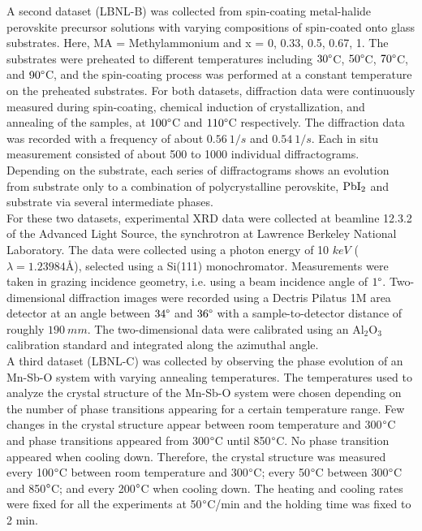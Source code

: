 A second dataset (LBNL-B) was collected from spin-coating metal-halide perovskite precursor solutions with varying compositions of  spin-coated onto glass substrates. Here, MA = Methylammonium and x = 0, 0.33, 0.5, 0.67, 1. The substrates were preheated to different temperatures including $30\degree $C, $50\degree $C, $70\degree $C, and $90\degree $C, and the spin-coating process was performed at a constant temperature on the preheated substrates. For both datasets, diffraction data were continuously measured during spin-coating, chemical induction of crystallization, and annealing of the samples, at $100\degree$C and $110\degree$C respectively. The diffraction data was recorded with a frequency of about $0.56 
 \ 1/\si{s}$ and $0.54 \ 1/\si{s}$. Each in situ measurement consisted of about 500 to 1000 individual diffractograms. Depending on the substrate, each series of diffractograms shows an evolution from substrate only to a combination of polycrystalline perovskite, $\ce{PbI2}$ and substrate via several intermediate phases. \\

For these two datasets, experimental XRD data were collected at beamline 12.3.2 of the Advanced Light Source, the synchrotron at Lawrence Berkeley National Laboratory. The data were collected using a photon energy of 10 $\si{keV}$ ($\lambda = 1.23984 \text{\AA}$), selected using a Si(111) monochromator. Measurements were taken in grazing incidence geometry, i.e. using a beam incidence angle of $1\degree$. Two-dimensional diffraction images were recorded using a Dectris Pilatus 1M area detector at an angle between $34\degree$ and $36\degree$ with a sample-to-detector distance of roughly $190 \ \si{mm}$. The two-dimensional data were calibrated using an Al$_{2}$O$_{3}$ calibration standard and integrated along the azimuthal angle. \\


A third dataset (LBNL-C) was collected by observing the phase evolution of an Mn-Sb-O system with varying annealing temperatures. The temperatures used to analyze the crystal structure of the Mn-Sb-O system were chosen depending on the number of phase transitions appearing for a certain temperature range. Few changes in the crystal structure appear between room temperature and 300$\degree$C and phase transitions appeared from 300$\degree$C until 850$\degree$C. No phase transition appeared when cooling down. Therefore, the crystal structure was measured every 100$\degree$C between room temperature and 300$\degree$C; every 50$\degree$C between 300$\degree$C and 850$\degree$C; and every 200$\degree$C when cooling down. The heating and cooling rates were fixed for all the experiments at 50$\degree$C/min and the holding time was fixed to 2 min. \\

